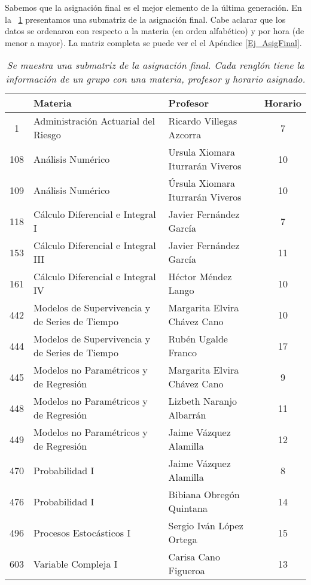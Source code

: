 Sabemos que la asignación final es el mejor elemento de la última generación. En la \tablename{~\ref{submatAsigFinal}} presentamos una submatriz de la asignación final. Cabe aclarar que los datos se ordenaron con respecto a la materia (en orden alfabético) y por hora (de menor a mayor). La matriz completa se puede ver el el Apéndice \ref{Ej_AsigFinal}.

\begin{table}[H]
\centering
\begin{tabular}{|c|p{7cm}|p{4.7cm}|c|}
\hline
\textbf{ } & \textbf{Materia} & \textbf{Profesor} & \textbf{Horario} \\ \hline
1 & Administración Actuarial del Riesgo & Ricardo Villegas Azcorra & 7 \\ \hline
108 & Análisis Numérico & Ursula Xiomara Iturrarán Viveros & 10 \\ \hline
109 & Análisis Numérico & Úrsula Xiomara Iturrarán Viveros & 10 \\ \hline
118 & Cálculo Diferencial e Integral I & Javier Fernández García & 7 \\ \hline
153 & Cálculo Diferencial e Integral III & Javier Fernández García & 11 \\ \hline
161 & Cálculo Diferencial e Integral IV & Héctor Méndez Lango & 10 \\ \hline
442 & Modelos de Supervivencia y de Series de Tiempo & Margarita Elvira Chávez Cano & 10 \\ \hline
444 & Modelos de Supervivencia y de Series de Tiempo & Rubén Ugalde Franco & 17 \\ \hline
445 & Modelos no Paramétricos y de Regresión & Margarita Elvira Chávez Cano & 9 \\ \hline
448 & Modelos no Paramétricos y de Regresión & Lizbeth Naranjo Albarrán & 11 \\ \hline
449 & Modelos no Paramétricos y de Regresión & Jaime Vázquez Alamilla & 12 \\ \hline
470 & Probabilidad I & Jaime Vázquez Alamilla & 8 \\ \hline
476 & Probabilidad I & Bibiana Obregón Quintana & 14 \\ \hline
496 & Procesos Estocásticos I & Sergio Iván López Ortega & 15 \\ \hline
603 & Variable Compleja I & Carisa Cano Figueroa & 13 \\ \hline
\end{tabular}
\caption[\textit{Submatriz con asignación final}]{\textit{Se muestra una submatriz de la asignación final. Cada renglón tiene la información de un grupo con una materia, profesor y horario asignado.}}\label{submatAsigFinal}
\end{table}